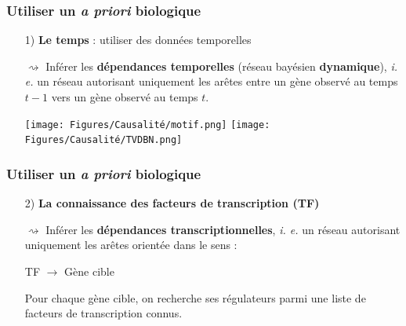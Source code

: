 \begin{frame}
   \frametitle{Utiliser un \textbf{\textit{a priori} biologique}}
  \pause 
 
   
 \begin{itemize}
     \item[1)] \textbf{Le temps} : utiliser des données temporelles 
       \pause 
       
     $\rightsquigarrow$ Inférer les \textbf{dépendances temporelles} (réseau bayésien \textbf{dynamique}), \textit{i. e.} un réseau autorisant uniquement les arêtes entre un gène observé au  temps $t-1$ vers un gène observé au temps $t$.
     
        \pause 
        
   	  \begin{center}
	     \texttt{[image: Figures/Causalité/motif.png]}\hspace{1cm}
	     \texttt{[image: Figures/Causalité/TVDBN.png]}
	   \end{center}
	   
	\scriptsize \cite{LebreBMC10}%

 \end{itemize}  
\end{frame}
		 
		 
		 
\begin{frame}
   \frametitle{Utiliser un \textbf{\textit{a priori} biologique}}
   
   
 \begin{itemize}
     \item[2)] \textbf{La connaissance des facteurs de transcription (TF)} 
       \pause 
       
     \vfill
     
      $\rightsquigarrow$ Inférer les \textbf{dépendances transcriptionnelles}, \textit{i. e.} un réseau autorisant uniquement les arêtes orientée dans le sens :
     
\begin{center}
    TF $\rightarrow$  Gène cible
\end{center}

\pause

\vfill

Pour chaque gène cible, on recherche ses régulateurs parmi une liste de facteurs de transcription connus.
     
      
   	  \begin{center}
	 
	   \end{center}
 \end{itemize}  
 
 \end{frame}
		 
